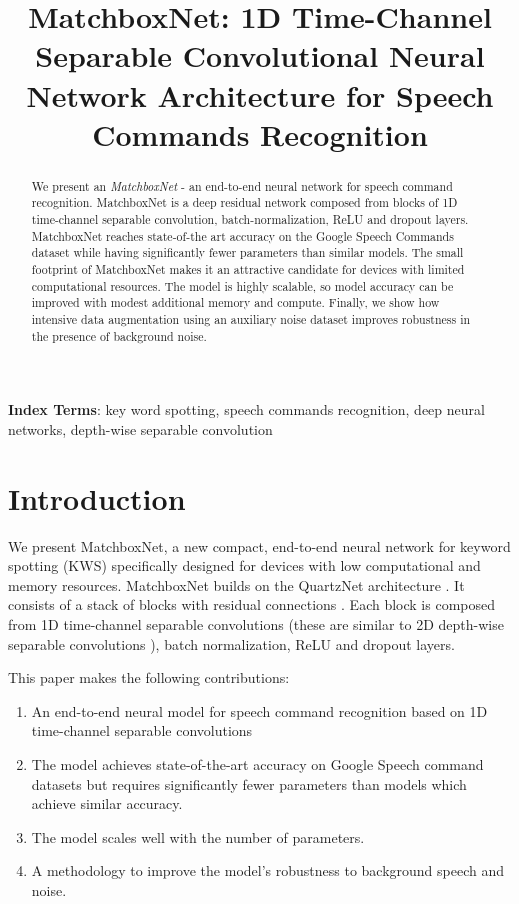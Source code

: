 \documentclass[a4paper]{article}
\title{MatchboxNet: 1D Time-Channel Separable Convolutional Neural Network Architecture for Speech Commands Recognition}
\begin{document}
\maketitle

\begin{abstract}
We present an \textit{MatchboxNet} - an end-to-end neural network for speech command recognition. MatchboxNet is a deep residual network composed from blocks of 1D time-channel separable convolution, batch-normalization, ReLU and dropout layers.  MatchboxNet reaches state-of-the art accuracy on the Google Speech Commands dataset while having significantly fewer parameters than similar  models. The small footprint of MatchboxNet makes it an attractive  candidate for devices with limited computational resources. The model is highly scalable, so model accuracy can be improved with modest additional memory and compute. Finally, we show how intensive data augmentation using an auxiliary noise dataset improves robustness in the presence of background noise.

\end{abstract}
\noindent\textbf{Index Terms}: key word spotting, speech commands recognition, deep neural networks, depth-wise separable convolution

\section{Introduction}

We present MatchboxNet, a new compact, end-to-end neural network for keyword spotting (KWS) specifically designed for devices with low computational and memory resources.
MatchboxNet builds on the QuartzNet architecture \cite{kriman2019quartznet}. It consists of a stack of blocks with residual connections \cite{he2015}. Each block is composed from 1D time-channel separable convolutions (these are similar to 2D depth-wise separable convolutions \cite{chollet2017xception,kaiser2017depthwise}), batch normalization, ReLU and dropout layers. 

This paper makes the following contributions:
\begin{enumerate}
  \item An end-to-end neural model for speech command recognition based on 1D time-channel separable convolutions
  \item The model achieves state-of-the-art accuracy on Google Speech command datasets \cite{warden2018speech} but requires significantly fewer parameters than models which achieve similar accuracy. 
  \item The model scales well with the number of parameters. 
  \item A methodology to improve the model's robustness to background speech and noise.
\end{enumerate}
\end{document}
